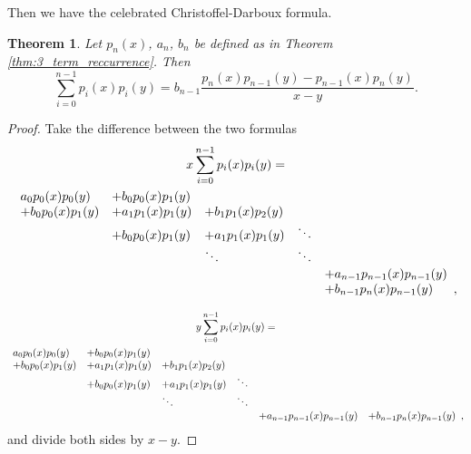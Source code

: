 \documentclass[11pt, a4paper]{article}
\numberwithin{equation}{section}
\newtheorem{thm}{Theorem}
\theoremstyle{definition}
\theoremstyle{remark}
\begin{document}
Then we have the celebrated Christoffel-Darboux formula.
\begin{thm}
  Let $p_n(x)$, $a_n$, $b_n$ be defined as in Theorem \ref{thm:3_term_reccurrence}. Then
  \begin{equation}
    \sum^{n - 1}_{i = 0} p_i(x) p_i(y) = b_{n - 1} \frac{p_n(x) p_{n - 1}(y) - p_{n - 1}(x) p_n(y)}{x - y}.
  \end{equation}
\end{thm}
\begin{proof}
  Take the difference between the two formulas
  \begin{multline}
    x \sum^{n - 1}_{i = 0} p_i(x) p_i(y) = \\
    \begin{array}[b]{lllll}
      a_0 p_0(x) p_0(y) & + b_0 p_0(x) p_1(y) & & & \\
      + b_0 p_0(x) p_1(y) & + a_1 p_1(x) p_1(y) & + b_1 p_1(x) p_2(y) & & \\
       & + b_0 p_0(x) p_1(y) & + a_1 p_1(x) p_1(y) & \ddots & \\
       & & \ddots & \ddots & \\
       & & & & + a_{n - 1} p_{n - 1}(x) p_{n - 1}(y) \\
       & & & & + b_{n - 1} p_n(x) p_{n - 1}(y)
    \end{array},
  \end{multline}

  \begin{multline}
    y \sum^{n - 1}_{i = 0} p_i(x) p_i(y) = \\
    \begin{array}[b]{llllll}
      a_0 p_0(x) p_0(y) & + b_0 p_0(x) p_1(y) & & & & \\
      + b_0 p_0(x) p_1(y) & + a_1 p_1(x) p_1(y) & + b_1 p_1(x) p_2(y) & & & \\
       & + b_0 p_0(x) p_1(y) & + a_1 p_1(x) p_1(y) & \ddots & & \\
       & & \ddots & \ddots & & \\
       & & & & + a_{n - 1} p_{n - 1}(x) p_{n - 1}(y) & + b_{n - 1} p_n(x) p_{n - 1}(y)
    \end{array}, \\
  \end{multline}
  and divide both sides by $x - y$.
\end{proof}
\end{document}
